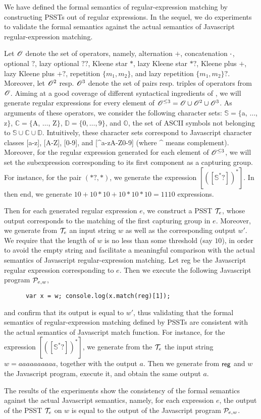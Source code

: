 
We have defined the formal semantics of regular-expression matching by constructing PSSTs out of regular expressions. 
In the sequel, we do experiments to validate the formal semantics against the actual semantics of Javascript regular-expression matching.

Let $\mathscr{O}$ denote the set of {\regexp} operators, namely, alternation $+$, concatenation $\cdot$, optional $?$, lazy optional $??$, Kleene star $*$, lazy Kleene star $*?$, Kleene plus $+$, lazy Kleene plus $+?$, repetition $\{m_1,m_2\}$, and lazy repetition $\{m_1,m_2\}?$. Moreover, let $\mathscr{O}^{2}$ resp. $\mathscr{O}^{3}$ denote the set of pairs resp. triples of operators from $\mathscr{O}$. 
Aiming at a good coverage of different syntactical ingredients of {\regexp}, we will generate regular expressions for every element of $\mathscr{O}^{\le 3} = \mathscr{O} \cup \mathscr{O}^2 \cup \mathscr{O}^3$.
As arguments of these operators, we consider the following character sets: $\mathbb{S} = \{$a, $\ldots$, z$\}$, $\mathbb{C}=\{$A, $\ldots$, Z$\}$, $\mathbb{D} = \{0,\ldots,9\}$, and $\mathbb{O}$, the set of ASCII symbols not belonging to $\mathbb{S} \cup \mathbb{C} \cup \mathbb{D}$.
Intuitively, these character sets correspond to Javascript character classes [a-z], [A-Z], [0-9], and [{\textasciicircum}a-zA-Z0-9] (where {\textasciicircum} means complement).
Moreover, for the regular expression generated for each element of $\mathscr{O}^{\le 3}$, we will set the subexpression corresponding to its first component as a capturing group. 
For instance, for the pair $(*?, *)$, we generate the {\regexp} expression $[([\mathbb{S}^*?])^{*}]$. In then end, we generate $10+10*10+10*10*10 = 1110$ {\regexp} expressions. 

Then for each generated regular expression $e$, we construct a PSST $\mathcal{T}_e$, whose output corresponds to the matching of the first capturing group in $e$.  Moreover, we generate from $\mathcal{T}_e$ an input string $w$ as well as the corresponding output $w'$. We require that the length of $w$ is no less than some threshold (say $10$), in order to avoid the empty string and facilitate a  meaningful comparison with the actual semantics of Javascript regular-expression matching. 
Let {\sf reg} be the Javascript regular expression corresponding to $e$. Then we execute the following Javascript program $\mathcal{P}_{e,w}$,
\begin{center}
{
\small
\begin{verbatim}
      var x = w; console.log(x.match(reg)[1]);
\end{verbatim}
}
\end{center}
and confirm that its output is equal to $w'$, thus validating that the formal semantics of  regular-expression matching defined by PSSTs are consistent with the actual semantics of Javascript {\sf match} function. For instance, for the {\regexp} expression $[([\mathbb{S}^*?])^{*}]$, we generate from the $\mathcal{T}_e$ the input string $w= aaaaaaaaaa$, together with the output $a$. Then we generate from ${\sf reg}$ and $w$ the Javascript program, execute it, and obtain the same output $a$.

The results of the experiments show the consistency of the formal semantics against the actual Javascript semantics, namely, for each {\regexp} expression $e$, the output of the PSST $\mathcal{T}_e$ on $w$ is equal to the output of the Javascript program $\mathcal{P}_{e,w}$.
